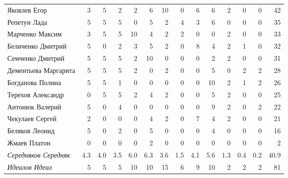 \documentclass[12pt]{article}
\newlength{\h}
\newlength{\x}
\begin{document}
\begin{small}
\begin{center}
\begin{tabular}{lrrrrrrrrrrrrr}
  Яковлев Егор           &    3  &  5  &    2  &   2  &    6  &   10  &    0  &    6  &    6  &    2  &     0  &     0  &     42  \\
  Репетун Лада           &    5  &  5  &    5  &   0  &    5  &    2  &    4  &    3  &    6  &    0  &     0  &     0  &     35  \\
  Марченко Максим        &    3  &  5  &    5  &  10  &    4  &    2  &    2  &    0  &    0  &    2  &     0  &     0  &     33  \\
  Беличенко Дмитрий      &    5  &  0  &    2  &   3  &    5  &    2  &    0  &    8  &    4  &    2  &     1  &     0  &     32  \\
  Семченко Дмитрий       &    5  &  5  &    5  &   2  &   10  &    0  &    0  &    0  &    2  &    2  &     0  &     0  &     31  \\
  Дементьева Маргарита   &    5  &  5  &    5  &   2  &    0  &    2  &    0  &    0  &    5  &    0  &     2  &     2  &     28  \\
  Богданова Полина       &    5  &  5  &    1  &   0  &    0  &    0  &    0  &    0  &   10  &    2  &     1  &     2  &     26  \\
  Терехов Александр      &    0  &  5  &    5  &   2  &    4  &    2  &    0  &    0  &    5  &    2  &     0  &     0  &     25  \\
  Антонюк Валерий        &    5  &  0  &    4  &   0  &    0  &    0  &    0  &    0  &    9  &    2  &     0  &     2  &     22  \\
  Чекулаев Сергей        &    2  &  0  &    0  &   0  &    4  &    2  &    0  &    7  &    4  &    2  &     0  &     0  &     21  \\
  Беляков Леонид         &    5  &  0  &    2  &   0  &    5  &    0  &    0  &    0  &    4  &    0  &     0  &     0  &     16  \\
  Жмаев Платон           &    0  &  0  &    0  &   0  &    2  &    0  &    0  &    0  &    0  &    0  &     0  &     0  &      2  \\
  \hline
  \textit{Середняков Середняк}    &  4.3  &  4.0  &  3.5  &  6.0  &  6.3  &  3.6  &  1.5  &  4.1  &  5.6  &  1.3  &  0.4  &  0.2  &  40.9  \\
  \textit{Идеалов Идеал}          &    5  &  5  &    5  &  10  &   10  &   15  &    6  &    9  &   10  &    2  &     2  &     2  &     81  \\
  \hline
\end{tabular}
\end{center}
\end{small}
\end{document}
